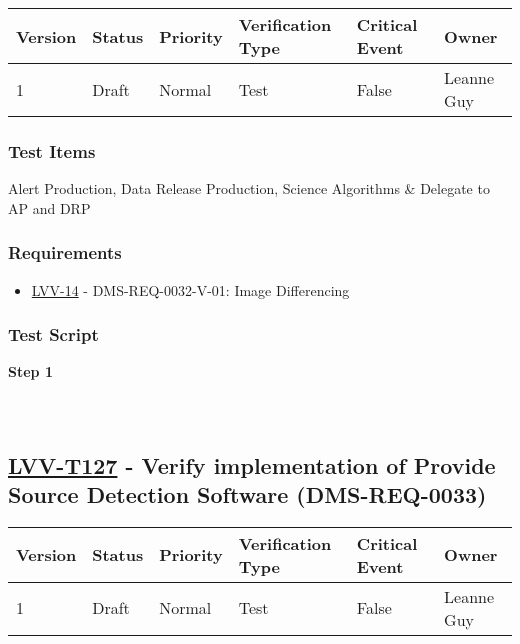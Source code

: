 \begin{longtable}[]{@{}llllll@{}}
\toprule
Version & Status & Priority & Verification Type & Critical Event &
Owner\tabularnewline
\midrule
\endhead
1 & Draft & Normal & Test & False & Leanne Guy\tabularnewline
\bottomrule
\end{longtable}

\hypertarget{test-items-102}{%
\subsubsection{Test Items}\label{test-items-102}}

Alert Production, Data Release Production, Science Algorithms \&
Delegate to AP and DRP

\hypertarget{requirements-103}{%
\subsubsection{Requirements}\label{requirements-103}}

\begin{itemize}
\tightlist
\item
  \href{https://jira.lsstcorp.org/browse/LVV-14}{LVV-14} -
  DMS-REQ-0032-V-01: Image Differencing
\end{itemize}

\hypertarget{test-script-103}{%
\subsubsection{Test Script}\label{test-script-103}}

\textbf{Step 1}\\
~\\
~\\

\hypertarget{lvv-t127---verify-implementation-of-provide-source-detection-software-dms-req-0033}{%
\subsection{\texorpdfstring{\href{https://jira.lsstcorp.org/secure/Tests.jspa\#/testCase/LVV-T127}{LVV-T127}
- Verify implementation of Provide Source Detection Software
(DMS-REQ-0033)}{LVV-T127 - Verify implementation of Provide Source Detection Software (DMS-REQ-0033)}}\label{lvv-t127---verify-implementation-of-provide-source-detection-software-dms-req-0033}}

\begin{longtable}[]{@{}llllll@{}}
\toprule
Version & Status & Priority & Verification Type & Critical Event &
Owner\tabularnewline
\midrule
\endhead
1 & Draft & Normal & Test & False & Leanne Guy\tabularnewline
\bottomrule
\end{longtable}

